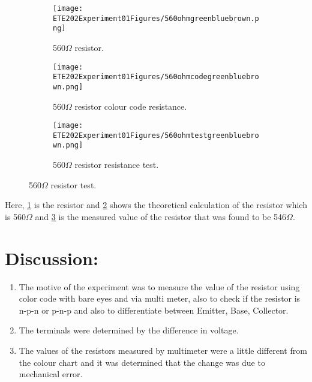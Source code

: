 \documentclass[a4paper, 14pt]{extarticle}
\begin{document}
            \begin{figure}[htbp]
            \centering
                \begin{subfigure}[h]{0.3\textwidth}
                \centering
                    \texttt{[image: ETE202Experiment01Figures/560ohmgreenbluebrown.png]}
                    \caption{560$\Omega$ resistor.}
                    \label{fig:subfig15}
                \end{subfigure}
                \hfill
                \begin{subfigure}[H]{0.3\textwidth}
                \centering
                    \texttt{[image: ETE202Experiment01Figures/560ohmcodegreenbluebrown.png]}
                    \caption{560$\Omega$ resistor colour code resistance.}
                    \label{fig:subfig16}
                \end{subfigure}
                \hfill
                \begin{subfigure}[h]{0.3\textwidth}
                \centering
                    \texttt{[image: ETE202Experiment01Figures/560ohmtestgreenbluebrown.png]}
                    \caption{560$\Omega$ resistor resistance test.}
                    \label{fig:subfig17}
                \end{subfigure}
                \caption{560$\Omega$ resistor test.}
                \label{fig:mainfig6}
            \end{figure}
            Here, \ref{fig:subfig15} is the resistor and \ref{fig:subfig16} shows the theoretical calculation of the resistor which is 560$\Omega$ and \ref{fig:subfig17} is the measured value of the resistor that was found to be 546$\Omega$.

    \newpage
    
    \section{Discussion:}
        \begin{enumerate}
            \item The motive of the experiment was to measure the value of the resistor using color code with bare eyes and via multi meter, also to check if the resistor is n-p-n or p-n-p and also to differentiate between Emitter, Base, Collector.
            \item The terminals were determined by the difference in voltage.
            \item The values of the resistors measured by multimeter were a little different from the colour chart and it was determined that the change was due to mechanical error.
        \end{enumerate}
    
\end{document}
